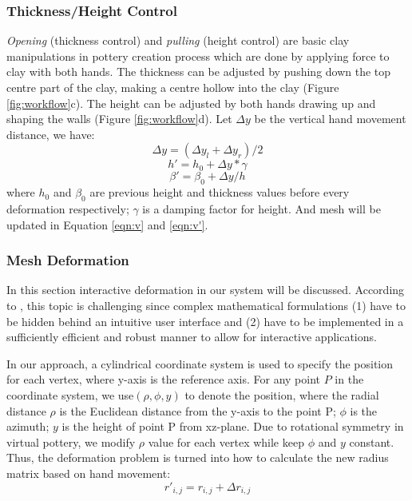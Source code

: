 \documentclass{svjour3}                     %
\begin{document}
\subsubsection{Thickness/Height Control}
\label{sec:4.2.2}
\textit{Opening} (thickness control) and \textit{pulling} (height control) are basic clay manipulations in pottery creation process which are done by applying force to clay with both hands. The thickness can be adjusted by pushing down the top centre part of the clay, making a centre hollow into the clay (Figure \ref{fig:workflow}c). The height can be adjusted by both hands drawing up and shaping the walls (Figure \ref{fig:workflow}d).
Let $\Delta y$ be the vertical hand movement distance, we have:
\begin{equation}
\Delta y = (\Delta y_{l} + \Delta y_{r})/2
\end{equation}
\begin{equation}
h' = h_{0} + \Delta y * \gamma
\end{equation}
\begin{equation}
\beta' = \beta_{0} + \Delta y/ h
\end{equation}
where $h_{0}$ and $\beta_{0}$ are previous height and thickness values before every deformation respectively; $\gamma$ is a damping factor for height. And mesh will be updated in Equation \ref{eqn:v} and \ref{eqn:v'}.

\subsubsection{Mesh Deformation}
\label{sec:4.2.3}
In this section interactive deformation in our system will be discussed. According to \cite{botsch2010polygon}, this topic is challenging since complex mathematical formulations (1) have to be hidden behind an intuitive user interface and (2) have to be implemented in a sufficiently efficient and robust manner to allow for interactive applications.

In our approach, a cylindrical coordinate system is used to specify the position for each vertex, where y-axis is the reference axis. For any point $P$ in the coordinate system, we use$(\rho, \phi, y)$ to denote the position, where the radial distance $\rho$ is the Euclidean distance from the y-axis to the point P; $\phi$ is the azimuth; $y$ is the height of point P from xz-plane.
Due to rotational symmetry in virtual pottery, we modify $\rho$ value for each vertex while keep $\phi$ and $y$ constant. Thus, the deformation problem is turned into how to calculate the new radius matrix based on hand movement:
\begin{equation}
r'_{i,j} = r_{i,j} + \Delta r_{i,j}
\end{equation}
\end{document}
